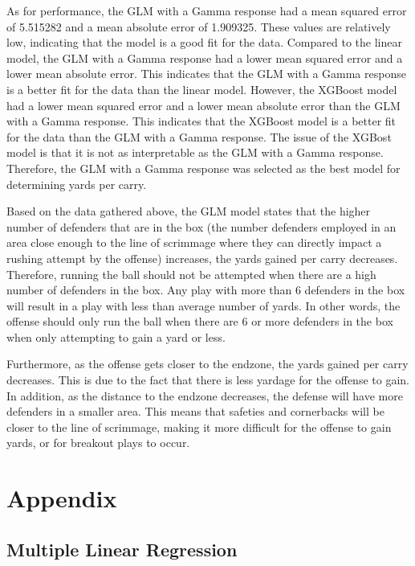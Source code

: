 \documentclass[
  super,
  preprint,
  3p]{elsarticle}
\begin{document}
As for performance, the GLM with a Gamma response had a mean squared
error of 5.515282 and a mean absolute error of 1.909325. These values
are relatively low, indicating that the model is a good fit for the
data. Compared to the linear model, the GLM with a Gamma response had a
lower mean squared error and a lower mean absolute error. This indicates
that the GLM with a Gamma response is a better fit for the data than the
linear model. However, the XGBoost model had a lower mean squared error
and a lower mean absolute error than the GLM with a Gamma response. This
indicates that the XGBoost model is a better fit for the data than the
GLM with a Gamma response. The issue of the XGBost model is that it is
not as interpretable as the GLM with a Gamma response. Therefore, the
GLM with a Gamma response was selected as the best model for determining
yards per carry.

Based on the data gathered above, the GLM model states that the higher
number of defenders that are in the box (the number defenders employed
in an area close enough to the line of scrimmage where they can directly
impact a rushing attempt by the offense) increases, the yards gained per
carry decreases. Therefore, running the ball should not be attempted
when there are a high number of defenders in the box. Any play with more
than 6 defenders in the box will result in a play with less than average
number of yards. In other words, the offense should only run the ball
when there are 6 or more defenders in the box when only attempting to
gain a yard or less.

Furthermore, as the offense gets closer to the endzone, the yards gained
per carry decreases. This is due to the fact that there is less yardage
for the offense to gain. In addition, as the distance to the endzone
decreases, the defense will have more defenders in a smaller area. This
means that safeties and cornerbacks will be closer to the line of
scrimmage, making it more difficult for the offense to gain yards, or
for breakout plays to occur.

\hypertarget{appendix}{%
\section{Appendix}\label{appendix}}

\hypertarget{multiple-linear-regression}{%
\subsection{Multiple Linear
Regression}\label{multiple-linear-regression}}
\end{document}
